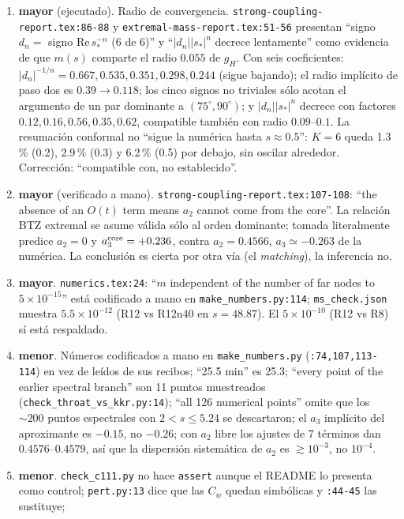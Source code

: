 \documentclass[10pt,a4paper]{article}
\newcommand{\MAY}{\textcolor{may}{\textbf{mayor}}}
\newcommand{\MEN}{\textbf{menor}}
\newcommand{\code}[1]{\texttt{#1}}
\begin{document}
\begin{enumerate}[label=E\arabic*.,leftmargin=2.4em]
\item \MAY{} (ejecutado). Radio de convergencia. \code{strong-coupling-report.tex:86-88} y
 \code{extremal-mass-report.tex:51-56} presentan ``signo $d_n=$ signo Re$\,s_*^{-n}$ (6 de 6)'' y
 ``$|d_n||s_*|^n$ decrece lentamente'' como evidencia de que $m(s)$ comparte el radio $0.055$ de
 $g_H$. Con seis coeficientes: $|d_n|^{-1/n}=0.667,0.535,0.351,0.298,0.244$ (sigue bajando);
 el radio implícito de paso dos es $0.39\to0.118$; los cinco signos no triviales sólo acotan el
 argumento de un par dominante a $(75^\circ,90^\circ)$; y $|d_n||s_*|^n$ decrece con factores
 $0.12,0.16,0.56,0.35,0.62$, compatible también con radio $0.09$--$0.1$. La resumación conformal
 no ``sigue la numérica hasta $s\approx0.5$'': $K=6$ queda 1.3\,\% (0.2), 2.9\,\% (0.3) y 6.2\,\%
 (0.5) por debajo, sin oscilar alrededor. Corrección: ``compatible con, no establecido''.
\item \MAY{} (verificado a mano). \code{strong-coupling-report.tex:107-108}: ``the absence of an
 $O(t)$ term means $a_2$ cannot come from the core''. La relación BTZ extremal se asume válida sólo
 al orden dominante; tomada literalmente predice $a_2=0$ y $a_3^{\rm core}=+0.236$, contra
 $a_2=0.4566$, $a_3\simeq-0.263$ de la numérica. La conclusión es cierta por otra vía (el
 \emph{matching}), la inferencia no.
\item \MAY. \code{numerics.tex:24}: ``$m$ independent of the number of far nodes to $5\times10^{-15}$''
 está codificado a mano en \code{make\_numbers.py:114}; \code{ms\_check.json} muestra
 $5.5\times10^{-12}$ (R12 vs R12n40 en $s=48.87$). El $5\times10^{-10}$ (R12 vs R8) sí está
 respaldado.
\item \MEN. Números codificados a mano en \code{make\_numbers.py} (\code{:74,107,113-114}) en vez de
 leídos de sus recibos; ``25.5 min'' es 25.3; ``every point of the earlier spectral branch'' son 11
 puntos muestreados (\code{check\_throat\_vs\_kkr.py:14}); ``all 126 numerical points'' omite que los
 $\sim200$ puntos espectrales con $2<s\le5.24$ se descartaron; el $a_3$ implícito del aproximante es
 $-0.15$, no $-0.26$; con $a_2$ libre los ajustes de 7 términos dan $0.4576$--$0.4579$, así que la
 dispersión sistemática de $a_2$ es $\gtrsim10^{-3}$, no $10^{-4}$.
\item \MEN. \code{check\_c111.py} no hace \code{assert} aunque el README lo presenta como control;
 \code{pert.py:13} dice que las $C_w$ quedan simbólicas y \code{:44-45} las sustituye;

\end{enumerate}
\end{document}
